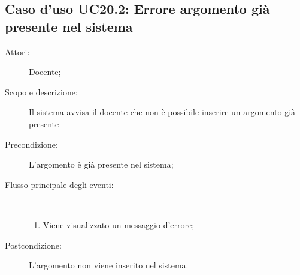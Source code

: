 \subsection{Caso d'uso UC20.2: Errore argomento già presente nel sistema}\begin{description}
	\item[Attori:] Docente;
	\item[Scopo e descrizione:] Il sistema avvisa il docente che non è possibile inserire un argomento già presente
	\item[Precondizione:] L'argomento è già presente nel sistema;
	
	\item[Flusso principale degli eventi:] \ 
	\begin{enumerate}
		\item Viene visualizzato un messaggio d'errore;
		
	\end{enumerate}
	\item[Postcondizione:] L'argomento non viene inserito nel sistema.
\end{description}
\hypertarget{UC20.3}{}
